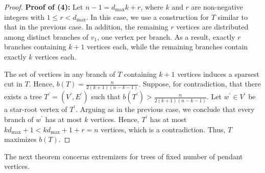 \documentclass[12pt]{article}
\begin{document}
\begin{proof}
\noindent\textbf{Proof of (4):} Let $n-1=d_{\max}k+r$, where $k$ and $r$ are non-negative integers with $1 \leq r <d_{\max}$.
In this case, we use a construction for $T$ similar to that in the previous case. In addition, the remaining $r$ vertices are distributed among distinct branches of $v_1$, one vertex per branch. As a result, exactly $r$ branches containing $k+1$ vertices each, while the remaining branches contain exactly $k$ vertices each.




 The set of vertices in any branch of $T$ containing $k+1$ vertices induces a sparsest cut in $T$.  Hence, $b(T)=\frac{n}{2(k+1)(n-k-1)}$. Suppose, for contradiction, that there exists a tree $T^\prime=(V^\prime,E^\prime)$ such that $b(T^\prime) >\frac{n}{2(k+1)(n-k-1)}$. Let $w^\prime \in V^\prime$ be a star-root vertex of $T^\prime.$ Arguing as in the previous case, we conclude that every branch of $w^\prime$ has at most $k$ vertices. Hence, $T^\prime$ has at most $kd_{\max}+1<kd_{\max}+1+r=n$ vertices, which is a contradiction. Thus, $T$ maximizes $b(T)$.
\end{proof}

The next theorem concerns extremizers for trees of fixed number of pendant vertices.
\end{document}
